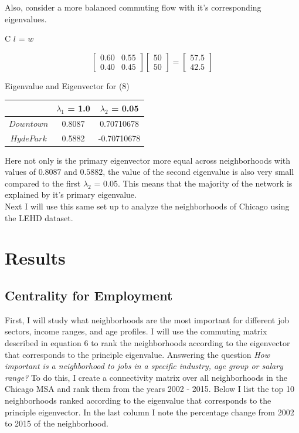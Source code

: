 \documentclass{article}
\theoremstyle{definition}
\theoremstyle{remark}
\begin{document}
Also, consider a more balanced commuting flow with it's corresponding eigenvalues.

\begin{center}C $l$ = $w$\end{center}
\begin{equation} 
  \begin{bmatrix}
    0.60 & 0.55\\
    0.40 & 0.45
  \end{bmatrix}
  \begin{bmatrix}
    50\\
    50
  \end{bmatrix}
  = 
  \begin{bmatrix}
    57.5\\
    42.5
  \end{bmatrix}
\end{equation}

\begin{center} 
Eigenvalue and Eigenvector for (8) \\
\begin{tabular}{||c | c c ||} 
 \hline
 & $\lambda_1$ = 1.0 & $\lambda_2$ = 0.05\\[0.5ex] 
 \hline\hline
 $Downtown$ & 0.8087 & 0.70710678 \\
 $Hyde Park$ & 0.5882 & -0.70710678  \\ 
 \hline
 \end{tabular}
 \end{center}

Here not only is the primary eigenvector more equal across neighborhoods with values of $0.8087$ and $0.5882$, the value of the second eigenvalue is also very small compared to the first $\lambda_2$ = 0.05.  This means that the majority of the network is explained by it's primary eigenvalue. \\

Next I will use this same set up to analyze the neighborhoods of Chicago using the LEHD dataset.

\section{Results}
\subsection{Centrality for Employment}
First, I will study what neighborhoods are the most important for different job sectors, income ranges, and age profiles.  I will use the commuting matrix described in equation 6 to rank the neighborhoods according to the eigenvector that corresponds to the principle eigenvalue.  Answering the question \textit{How important is a neighborhood to jobs in a specific industry, age group or salary range?}  To do this, I create a connectivity matrix over all neighborhoods in the Chicago MSA and rank them from the years 2002 - 2015.  Below I list the top 10 neighborhoods ranked according to the eigenvalue that corresponds to the principle eigenvector.  In the last column I note the percentage change from 2002 to 2015 of the neighborhood. \\
\end{document}
